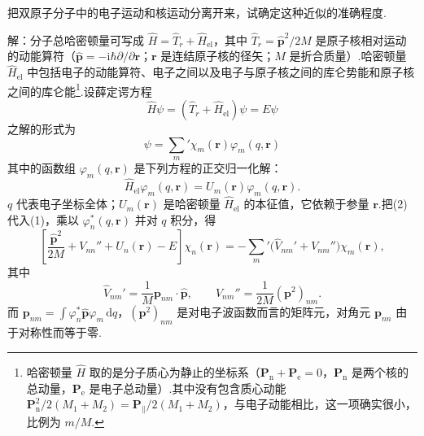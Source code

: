\begin{xiti}

把双原子分子中的电子运动和核运动分离开来，试确定这种近似的准确程度.

解：分子总哈密顿量可写成 $\hat{H}=\hat{T}_r+\hat{H}_{\mathrm{el}}$，其中 $\hat{T}_r=\hat{\boldsymbol{p}}^2/2M$ 是原子核相对运动的动能算符（$\hat{\boldsymbol{p}}=-\mathrm{i}\hbar\partial/\partial\boldsymbol{r}$；$\boldsymbol{r}$ 是连结原子核的径矢；$M$ 是折合质量）.哈密顿量 $\hat{H}_{\mathrm{el}}$ 中包括电子的动能算符、电子之间以及电子与原子核之间的库仑势能和原子核之间的库仑能\footnote{哈密顿量 $\hat{H}$ 取的是分子质心为静止的坐标系（$\boldsymbol{P}_{\mathrm{n}}+\boldsymbol{P}_{\mathrm{e}}=0$，$\boldsymbol{P}_{\mathrm{n}}$ 是两个核的总动量，$\boldsymbol{P}_{\mathrm{e}}$ 是电子总动量）.其中没有包含质心动能 $\boldsymbol{P}_{\mathrm{n}}^2/2(M_1+M_2)=\boldsymbol{P}_{\parallel}/2(M_1+M_2)$，与电子动能相比，这一项确实很小，比例为 $m/M$.}.设薛定谔方程
\setcounter{equation}{0}\renewcommand{\theequation}{\arabic{equation}}%
\begin{equation}
  \hat{H}\psi=(\hat{T}_r+\hat{H}_{\mathrm{el}})\psi=E\psi
\end{equation}
之解的形式为
\begin{equation}
  \psi=\sum_m{}'\chi_m(\boldsymbol{r})\varphi_m(q,\boldsymbol{r})
\end{equation}
其中的函数组 $\varphi_m(q,\boldsymbol{r})$ 是下列方程的正交归一化解：
\begin{equation}
  \hat{H}_{\mathrm{el}}\varphi_m(q,\boldsymbol{r})=U_m(\boldsymbol{r})\varphi_m(q,\boldsymbol{r}).
\end{equation}
$q$ 代表电子坐标全体；$U_m(\boldsymbol{r})$ 是哈密顿量 $\hat{H}_{\mathrm{el}}$ 的本征值，它依赖于参量 $\boldsymbol{r}$.把(2)代入(1)，乘以 $\varphi_n^*(q,\boldsymbol{r})$ 并对 $q$ 积分，得
\begin{equation}
  \left[\frac{\hat{\boldsymbol{p}}^2}{2M}+V_{nn}''+U_n(\boldsymbol{r})-E\right]\chi_n(\boldsymbol{r})
  =-\sum_m{}'\bigl(\hat{V}_{nm}'+V_{nm}''\bigr)\chi_m(\boldsymbol{r}),
\end{equation}
其中
\begin{equation*}
  \hat{V}_{nm}'=\frac{1}{M}\boldsymbol{p}_{nm}\cdot\hat{\boldsymbol{p}},\qquad
  V_{nm}''=\frac{1}{2M}(\boldsymbol{p}^2)_{nm}.
\end{equation*}
而 $\boldsymbol{p}_{nm}=\int\varphi_n^*\hat{\boldsymbol{p}}\varphi_m\,\mathrm{d}q$，$(\boldsymbol{p}^2)_{nm}$ 是对电子波函数而言的矩阵元，对角元 $\boldsymbol{p}_{nn}$ 由于对称性而等于零.


\end{xiti}
